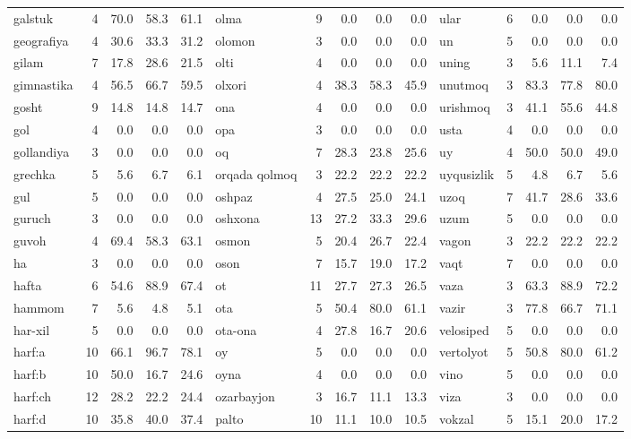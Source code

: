 \documentclass[a4paper,10pt]{article}
\begin{document}
\begin{longtable}{lrrrr|lrrrr|lrrrr}
galstuk & 4 & 70.0 & 58.3 & 61.1 & olma & 9 & 0.0 & 0.0 & 0.0 & ular & 6 & 0.0 & 0.0 & 0.0 \\
geografiya & 4 & 30.6 & 33.3 & 31.2 & olomon & 3 & 0.0 & 0.0 & 0.0 & un & 5 & 0.0 & 0.0 & 0.0 \\
gilam & 7 & 17.8 & 28.6 & 21.5 & olti & 4 & 0.0 & 0.0 & 0.0 & uning & 3 & 5.6 & 11.1 & 7.4 \\
gimnastika & 4 & 56.5 & 66.7 & 59.5 & olxo\textquotesingle{}ri & 4 & 38.3 & 58.3 & 45.9 & unutmoq & 3 & 83.3 & 77.8 & 80.0 \\
go\textquotesingle{}sht & 9 & 14.8 & 14.8 & 14.7 & ona & 4 & 0.0 & 0.0 & 0.0 & urishmoq & 3 & 41.1 & 55.6 & 44.8 \\
gol & 4 & 0.0 & 0.0 & 0.0 & opa & 3 & 0.0 & 0.0 & 0.0 & usta & 4 & 0.0 & 0.0 & 0.0 \\
gollandiya & 3 & 0.0 & 0.0 & 0.0 & oq & 7 & 28.3 & 23.8 & 25.6 & uy & 4 & 50.0 & 50.0 & 49.0 \\
grechka & 5 & 5.6 & 6.7 & 6.1 & orqada qolmoq & 3 & 22.2 & 22.2 & 22.2 & uyqusizlik & 5 & 4.8 & 6.7 & 5.6 \\
gul & 5 & 0.0 & 0.0 & 0.0 & oshpaz & 4 & 27.5 & 25.0 & 24.1 & uzoq & 7 & 41.7 & 28.6 & 33.6 \\
guruch & 3 & 0.0 & 0.0 & 0.0 & oshxona & 13 & 27.2 & 33.3 & 29.6 & uzum & 5 & 0.0 & 0.0 & 0.0 \\
guvoh & 4 & 69.4 & 58.3 & 63.1 & osmon & 5 & 20.4 & 26.7 & 22.4 & vagon & 3 & 22.2 & 22.2 & 22.2 \\
ha & 3 & 0.0 & 0.0 & 0.0 & oson & 7 & 15.7 & 19.0 & 17.2 & vaqt & 7 & 0.0 & 0.0 & 0.0 \\
hafta & 6 & 54.6 & 88.9 & 67.4 & ot & 11 & 27.7 & 27.3 & 26.5 & vaza & 3 & 63.3 & 88.9 & 72.2 \\
hammom & 7 & 5.6 & 4.8 & 5.1 & ota & 5 & 50.4 & 80.0 & 61.1 & vazir & 3 & 77.8 & 66.7 & 71.1 \\
har-xil & 5 & 0.0 & 0.0 & 0.0 & ota-ona & 4 & 27.8 & 16.7 & 20.6 & velosiped & 5 & 0.0 & 0.0 & 0.0 \\
harf:a & 10 & 66.1 & 96.7 & 78.1 & oy & 5 & 0.0 & 0.0 & 0.0 & vertolyot & 5 & 50.8 & 80.0 & 61.2 \\
harf:b & 10 & 50.0 & 16.7 & 24.6 & oyna & 4 & 0.0 & 0.0 & 0.0 & vino & 5 & 0.0 & 0.0 & 0.0 \\
harf:ch & 12 & 28.2 & 22.2 & 24.4 & ozarbayjon & 3 & 16.7 & 11.1 & 13.3 & viza & 3 & 0.0 & 0.0 & 0.0 \\
harf:d & 10 & 35.8 & 40.0 & 37.4 & palto & 10 & 11.1 & 10.0 & 10.5 & vokzal & 5 & 15.1 & 20.0 & 17.2 \\

\end{longtable}
\end{document}
